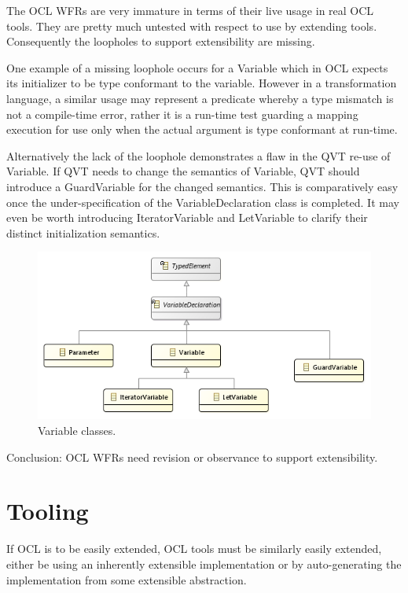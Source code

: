 \documentclass{llncs}
\begin{document}
The OCL WFRs are very immature in terms of their live usage in real OCL tools. They are pretty much untested with respect to use by extending tools. Consequently the loopholes to support extensibility are missing.

One example of a missing loophole occurs for a Variable which in OCL expects its initializer to be type conformant to the variable. However in a transformation language, a similar usage may represent a predicate whereby a type mismatch is not a compile-time error, rather it is a run-time test guarding a mapping execution for use only when the actual argument is type conformant at run-time.

Alternatively the lack of the loophole demonstrates a flaw in the QVT re-use of Variable. If QVT needs to change the semantics of Variable, QVT should introduce a GuardVariable for the changed semantics. This is comparatively easy once the under-specification of the VariableDeclaration class is completed. It may even be worth introducing IteratorVariable and LetVariable to clarify their distinct initialization semantics.


\begin{figure}[h]
	\centering
	\includegraphics[width=1.0\textwidth]{Variablesclassdiagram.png}
	\caption{Variable classes.}
	\label{fig:Variablesclassdiagram}
\end{figure}

Conclusion: OCL WFRs need revision or observance to support extensibility.

\section{Tooling}\label{Tooling}

If OCL is to be easily extended, OCL tools must be similarly easily extended, either be using an inherently extensible implementation or by auto-generating the implementation from some extensible abstraction.
\end{document}
